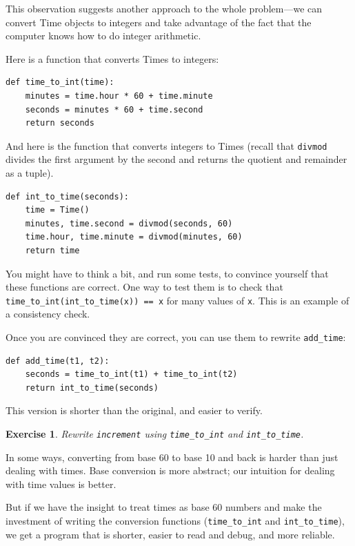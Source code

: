 \documentclass[12pt,a4paper,final,twoside,onecolumn,titlepage]{book}
\newtheorem{exercise}{Exercise}[chapter]
\begin{document}
This observation suggests another approach to the whole problem---we
can convert Time objects to integers and take advantage of the fact
that the computer knows how to do integer arithmetic.  

Here is a function that converts Times to integers:

\begin{verbatim}
def time_to_int(time):
    minutes = time.hour * 60 + time.minute
    seconds = minutes * 60 + time.second
    return seconds
\end{verbatim}
%
And here is the function that converts integers to Times
(recall that {\tt divmod} divides the first argument by the second
and returns the quotient and remainder as a tuple).

\begin{verbatim}
def int_to_time(seconds):
    time = Time()
    minutes, time.second = divmod(seconds, 60)
    time.hour, time.minute = divmod(minutes, 60)
    return time
\end{verbatim}
%
You might have to think a bit, and run some tests, to convince
yourself that these functions are correct.  One way to test them is to
check that \verb"time_to_int(int_to_time(x)) == x" for many values of
{\tt x}.  This is an example of a consistency check.

Once you are convinced they are correct, you can use them to 
rewrite \verb"add_time":

\begin{verbatim}
def add_time(t1, t2):
    seconds = time_to_int(t1) + time_to_int(t2)
    return int_to_time(seconds)
\end{verbatim}
%
This version is shorter than the original, and easier to verify.

\begin{exercise}

Rewrite {\tt increment} using \verb"time_to_int" and \verb"int_to_time".

\end{exercise}

In some ways, converting from base 60 to base 10 and back is harder
than just dealing with times.  Base conversion is more abstract; our
intuition for dealing with time values is better.

But if we have the insight to treat times as base 60 numbers and make
the investment of writing the conversion functions (\verb"time_to_int"
and \verb"int_to_time"), we get a program that is shorter, easier to
read and debug, and more reliable.
\end{document}
